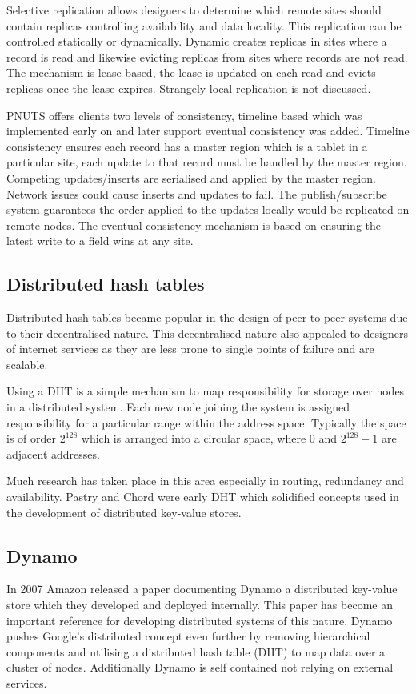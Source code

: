 Selective replication allows designers to determine which remote sites should contain replicas controlling availability and data locality. This replication can be controlled statically or dynamically. Dynamic creates replicas in sites where a record is read and likewise evicting replicas from sites where records are not read. The mechanism is lease based, the lease is updated on each read and evicts replicas once the lease expires. Strangely local replication is not discussed.

PNUTS offers clients two levels of consistency, timeline based which was implemented early on and later support eventual consistency was added. Timeline consistency ensures each record has a master region which is a tablet in a particular site, each update to that record must be handled by the master region. Competing updates/inserts are serialised and applied by the master region. Network issues could cause inserts and updates to fail. The publish/subscribe system guarantees the order applied to the updates locally would be replicated on remote nodes. The eventual consistency mechanism is based on ensuring the latest write to a field wins at any site.

\subsection{Distributed hash tables}
Distributed hash tables became popular in the design of peer-to-peer systems due to their decentralised nature. This decentralised nature also appealed to designers of internet services as they are less prone to single points of failure and are scalable.

Using a DHT is a simple mechanism to map responsibility for storage over nodes in a distributed system. Each new node joining the system is assigned responsibility for a particular range within the address space. Typically the space is of order $2^{128}$ which is arranged into a circular space, where 0 and $2^{128}-1$ are adjacent addresses. 

Much research has taken place in this area especially in routing, redundancy and availability. Pastry\cite{pastry} and Chord\cite{chord} were early DHT which solidified concepts used in the development of distributed key-value stores.


\subsection{Dynamo}
In 2007 Amazon released a paper documenting Dynamo\cite{amazonDynamo} a distributed key-value store which they developed and deployed internally. This paper has become an important reference for developing distributed systems of this nature. Dynamo pushes Google's distributed concept even further by removing hierarchical components and utilising a distributed hash table (DHT) to map data over a cluster of nodes. Additionally Dynamo is self contained not relying on external services.

